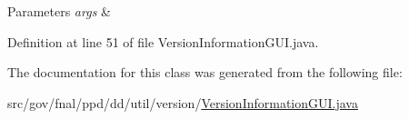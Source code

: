\begin{DoxyParams}{Parameters}
{\em args} & \\
\hline
\end{DoxyParams}


Definition at line 51 of file Version\-Information\-G\-U\-I.\-java.



The documentation for this class was generated from the following file\-:\begin{DoxyCompactItemize}
\item 
src/gov/fnal/ppd/dd/util/version/\hyperlink{VersionInformationGUI_8java}{Version\-Information\-G\-U\-I.\-java}\end{DoxyCompactItemize}
